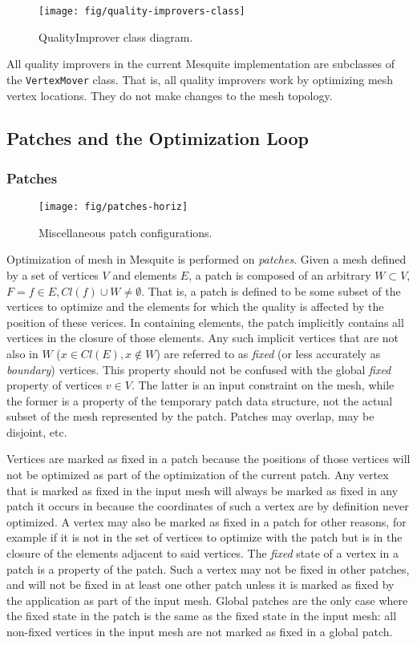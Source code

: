 \documentclass{article}
\begin{document}
\begin{figure}[htb]
\texttt{[image: fig/quality-improvers-class]}
\caption{QualityImprover class diagram.\label{fig:qual-improv-class}}
\end{figure}

All quality improvers in the current Mesquite implementation are subclasses of the \texttt{VertexMover} class.  That is, all quality improvers work by optimizing mesh vertex locations.  They do not make changes to the mesh topology.

\subsection{Patches and the Optimization Loop}

\subsubsection{Patches}

\begin{figure}[htb]
\texttt{[image: fig/patches-horiz]}
\caption{Miscellaneous patch configurations.\label{fig:patch-types}}
\end{figure}

Optimization of mesh in Mesquite is performed on \emph{patches}.  Given a mesh defined by a set of vertices $V$ and elements $E$, a patch is composed of an arbitrary $W \subset V$,  $F={f \in E, Cl(f) \cup W \ne \emptyset}$.  That is, a patch is defined to be some subset of the vertices to optimize and the elements for which the quality is affected by the position of these verices.  In containing elements, the patch implicitly contains all vertices in the closure of those elements.  Any such implicit vertices that are not also in $W$ ($x \in Cl(E), x \notin W$) are referred to as \emph{fixed} (or less accurately as \emph{boundary}) vertices.  This property should not be confused with the global \emph{fixed} property of vertices $v \in V$.  The latter is an input constraint on the mesh, while the former is a property of the temporary patch data structure, not the actual subset of the mesh represented by the patch.   Patches may overlap, may be disjoint, etc.  

Vertices are marked as fixed in a patch because the positions of those vertices will not be optimized as part of the optimization of the current patch.  Any vertex that is marked as fixed in the input mesh will always be marked as fixed in any patch it occurs in because the coordinates of such a vertex are by definition never optimized.  A vertex may also be marked as fixed in a patch for other reasons, for example if it is not in the set of vertices to optimize with the patch but is in the closure of the elements adjacent to said vertices.  The \emph{fixed} state of a vertex in a patch is a property of the patch.  Such a vertex may not be fixed in other patches, and will not be fixed in at least one other patch unless it is marked as fixed by the application as part of the input mesh.  Global patches are the only case where the fixed state in the patch is the same as the fixed state in the input mesh:  all non-fixed vertices in the input mesh are not marked as fixed in a global patch.
\end{document}
